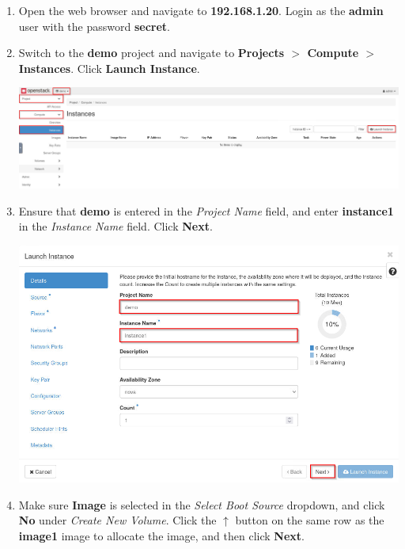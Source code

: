 \documentclass[letterpaper, 12pt]{article}
\begin{document}
\begin{enumerate}
    \item Open the web browser and navigate to \textbf{192.168.1.20}. Login as the \textbf{admin} user with the password
    \textbf{secret}.

    \item Switch to the \textbf{demo} project and navigate to
    \textbf{Projects $>$ Compute $>$ Instances}. Click \textbf{Launch Instance}.

    \begin{center}
        \includegraphics[width=\linewidth]{images/part4/step2.png}
    \end{center}

    \item Ensure that \textbf{demo} is entered in the \textit{Project Name} field, and enter \textbf{instance1} in the
    \textit{Instance Name} field. Click \textbf{Next}.
    
    \begin{center}
        \includegraphics[width=\linewidth]{images/part4/step3.png}
    \end{center}

    \item Make sure \textbf{Image} is selected in the \textit{Select Boot Source} dropdown, and click \textbf{No} under
    \textit{Create New Volume}. Click the $\uparrow$ button on the same row as the \textbf{image1} image to allocate the
    image, and then click \textbf{Next}.


\end{enumerate}
\end{document}
